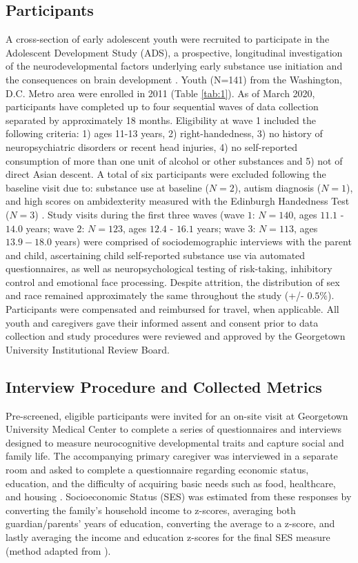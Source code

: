 \documentclass[utf8]{frontiersSCNS} %
\begin{document}
\subsection{Participants} 
A cross-section of early adolescent youth were recruited to participate in the Adolescent Development Study (ADS), a prospective, longitudinal investigation of the neurodevelopmental factors underlying early substance use initiation and the consequences on brain development \citep{Fishbein2016}. Youth (N=141) from the Washington, D.C. Metro area were enrolled in 2011 (Table \ref{tab:1}). As of March 2020, participants have completed up to four sequential waves of data collection separated by approximately 18 months. Eligibility at wave 1 included the following criteria: 1) ages 11-13 years, 2) right-handedness, 3) no history of neuropsychiatric disorders or recent head injuries, 4) no self-reported consumption of more than one unit of alcohol or other substances and 5) not of direct Asian descent. A total of six participants were excluded following the baseline visit due to: substance use at baseline ($N=2$), autism diagnosis ($N=1$), and high scores on ambidexterity measured with the Edinburgh Handedness Test ($N=3$) \citep{veale2014edinburgh}. Study visits during the first three waves (wave $1$: $N=140$, ages $11.1$ - $14.0$ years; wave $2$:  $N=123$, ages $12.4$ - $16.1$ years; wave $3$: $N=113$, ages $13.9 - 18.0$ years) were comprised of sociodemographic interviews with the parent and child, ascertaining child self-reported substance use via automated questionnaires, as well as neuropsychological testing of risk-taking, inhibitory control and emotional face processing. Despite attrition, the distribution of sex and race remained approximately the same throughout the study (+/- $0.5\%$). Participants were compensated and reimbursed for travel, when applicable. All youth and caregivers gave their informed assent and consent prior to data collection and study procedures were reviewed and approved by the Georgetown University Institutional Review Board. 
\subsection{Interview Procedure and Collected Metrics} Pre-screened, eligible participants were invited for an on-site visit at Georgetown University Medical Center to complete a series of questionnaires and interviews designed to measure neurocognitive developmental traits and capture social and family life. The accompanying primary caregiver was interviewed in a separate room and asked to complete a questionnaire regarding economic status, education, and the difficulty of acquiring basic needs such as food, healthcare, and housing \citep{bornstein2003socioeconomic}. Socioeconomic Status (SES) was estimated from these responses by converting the family’s household income to z-scores, averaging both guardian/parents' years of education, converting the average to a z-score, and lastly averaging the income and education z-scores for the final SES measure (method adapted from \cite{manuck2010ses}).
\end{document}
